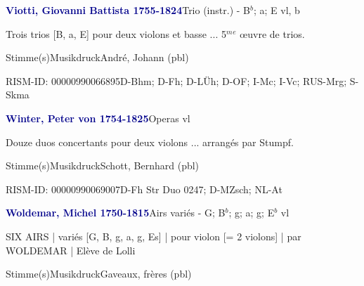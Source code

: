 \documentclass[twocolumn, 12pt]{book}
\begin{document}
\par \vspace{16pt} \textcolor{darkblue}{\textbf{Viotti, Giovanni Battista  1755-1824}}\hfillplus{\textbf{[340]}}\newline Trio (instr.) - B$^b$; a; E vl, b
\par \begin{itshape}Trois trios [B, a, E] pour deux violons et basse ... 5$^m$$^e$ œuvre de trios.\end{itshape} 
\par \textcolor{darkblue}{}  Stimme(s)\newline Musikdruck\newline André, Johann  (pbl)
\par RISM-ID: 00000990066895\newline D-Bhm; D-Fh; D-LÜh; D-OF; I-Mc; I-Vc; RUS-Mrg; S-Skma
\par \vspace{16pt} \textcolor{darkblue}{\textbf{Winter, Peter von  1754-1825}}\hfillplus{\textbf{[341]}}\newline Operas vl
\par \begin{itshape}Douze duos concertants pour deux violons ... arrangés par Stumpf.\end{itshape} 
\par \textcolor{darkblue}{}  Stimme(s)\newline Musikdruck\newline Schott, Bernhard  (pbl)
\par RISM-ID: 00000990069007\newline D-Fh  Str Duo 0247; D-MZsch; NL-At
\par \vspace{16pt} \textcolor{darkblue}{\textbf{Woldemar, Michel  1750-1815}}\hfillplus{\textbf{[342]}}\newline Airs variés - G; B$^b$; g; a; g; E$^b$ vl
\par \begin{itshape}SIX AIRS | variés [G, B, g, a, g, Es] | pour violon [= 2 violons] | par WOLDEMAR | Elève de Lolli\end{itshape} 
\par \textcolor{darkblue}{}  Stimme(s)\newline Musikdruck\newline Gaveaux, frères  (pbl)
\end{document}
